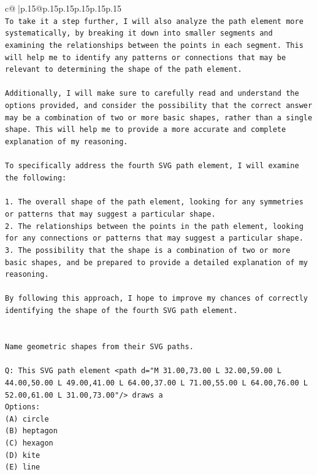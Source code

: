 \documentclass{article}
\begin{document}
{\begin{supertabular}{c@{$\;$}|p{.15\linewidth}@{}p{.15\linewidth}p{.15\linewidth}p{.15\linewidth}p{.15\linewidth}p{.15\linewidth}}
{{{\\ 
\texttt{To take it a step further, I will also analyze the path element more systematically, by breaking it down into smaller segments and examining the relationships between the points in each segment. This will help me to identify any patterns or connections that may be relevant to determining the shape of the path element.} \\
\\ 
\texttt{Additionally, I will make sure to carefully read and understand the options provided, and consider the possibility that the correct answer may be a combination of two or more basic shapes, rather than a single shape. This will help me to provide a more accurate and complete explanation of my reasoning.} \\
\\ 
\texttt{To specifically address the fourth SVG path element, I will examine the following:} \\
\\ 
\texttt{1. The overall shape of the path element, looking for any symmetries or patterns that may suggest a particular shape.} \\
\texttt{2. The relationships between the points in the path element, looking for any connections or patterns that may suggest a particular shape.} \\
\texttt{3. The possibility that the shape is a combination of two or more basic shapes, and be prepared to provide a detailed explanation of my reasoning.} \\
\\ 
\texttt{By following this approach, I hope to improve my chances of correctly identifying the shape of the fourth SVG path element.} \\
\\ 
\\ 
\texttt{Name geometric shapes from their SVG paths.} \\
\\ 
\texttt{Q: This SVG path element <path d="M 31.00,73.00 L 32.00,59.00 L 44.00,50.00 L 49.00,41.00 L 64.00,37.00 L 71.00,55.00 L 64.00,76.00 L 52.00,61.00 L 31.00,73.00"/> draws a} \\
\texttt{Options:} \\
\texttt{(A) circle} \\
\texttt{(B) heptagon} \\
\texttt{(C) hexagon} \\
\texttt{(D) kite} \\
\texttt{(E) line} \\
}}}
\end{supertabular}}
\end{document}
